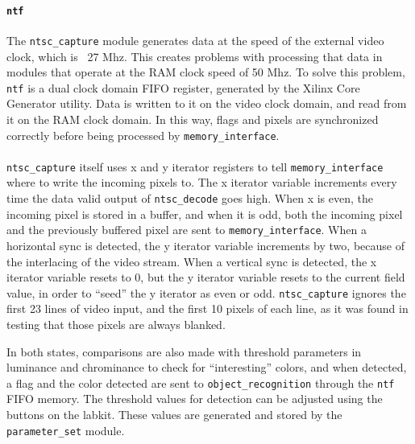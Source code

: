 \documentclass[10pt]{article}
\begin{document}
\paragraph{{\tt ntf}} The {\tt ntsc\_capture} module generates data at the speed of the external video clock, which is ~27 Mhz. This creates problems with processing that data in modules that operate at the RAM clock speed of 50 Mhz. To solve this problem, {\tt ntf} is a dual clock domain FIFO register, generated by the Xilinx Core Generator utility. Data is written to it on the video clock domain, and read from it on the RAM clock domain. In this way, flags and pixels are synchronized correctly before being processed by {\tt memory\_interface}.

\paragraph{} {\tt ntsc\_capture} itself uses x and y iterator registers to tell {\tt memory\_interface} where to write the incoming pixels to. The x iterator variable increments every time the data valid output of {\tt ntsc\_decode} goes high. When x is even, the incoming pixel is stored in a buffer, and when it is odd, both the incoming pixel and the previously buffered pixel are sent to {\tt memory\_interface}. When a horizontal sync is detected, the y iterator variable increments by two, because of the interlacing of the video stream. When a vertical sync is detected, the x iterator variable resets to 0, but the y iterator variable resets to  the current field value, in order to ``seed'' the y iterator as even or odd. {\tt ntsc\_capture} ignores the first 23 lines of video input, and the first 10 pixels of each line, as it was found in testing that those pixels are always blanked.

In both states, comparisons are also made with threshold parameters in luminance and chrominance to check for ``interesting'' colors, and when detected, a flag and the color detected are sent to {\tt object\_recognition} through the {\tt ntf} FIFO memory. The threshold values for detection can be adjusted using the buttons on the labkit. These values are generated and stored by the {\tt parameter\_set} module.
\end{document}
